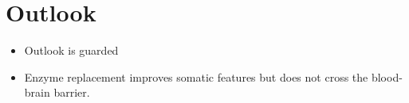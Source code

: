 \section{Outlook}
\begin{itemize}[noitemsep]
  \item Outlook is guarded
  \item Enzyme replacement improves somatic features but does not cross the blood-brain barrier.
\end{itemize}
